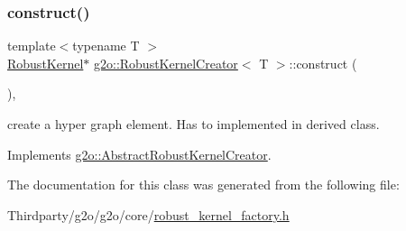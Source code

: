 \subsubsection{\texorpdfstring{construct()}{construct()}}
{\footnotesize\ttfamily template$<$typename T $>$ \\
\mbox{\hyperlink{classg2o_1_1_robust_kernel}{Robust\+Kernel}}$\ast$ \mbox{\hyperlink{classg2o_1_1_robust_kernel_creator}{g2o\+::\+Robust\+Kernel\+Creator}}$<$ T $>$\+::construct (\begin{DoxyParamCaption}{ }\end{DoxyParamCaption})\hspace{0.3cm}{\ttfamily [inline]}, {\ttfamily [virtual]}}

create a hyper graph element. Has to implemented in derived class. 

Implements \mbox{\hyperlink{classg2o_1_1_abstract_robust_kernel_creator_a3022ab9279e52151d37f8cb4d1524d47}{g2o\+::\+Abstract\+Robust\+Kernel\+Creator}}.



The documentation for this class was generated from the following file\+:\begin{DoxyCompactItemize}
\item 
Thirdparty/g2o/g2o/core/\mbox{\hyperlink{robust__kernel__factory_8h}{robust\+\_\+kernel\+\_\+factory.\+h}}\end{DoxyCompactItemize}
